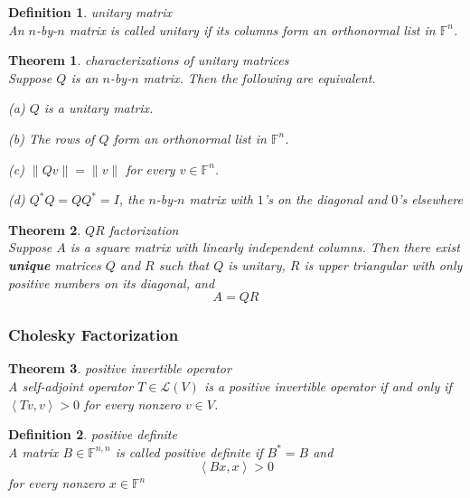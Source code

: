 \documentclass{article}
\newtheorem{theorem}{Theorem}[subsection]
\newtheorem{definition}{Definition}[subsection]
\newcommand{\FF}{\mathbb{F}}
\begin{document}
\begin{CJK}{UTF8}{gkai}
\begin{definition}
    unitary matrix\\

    An $n$-by-$n$ matrix is called unitary if its columns form an orthonormal list in $\FF^n$.
\end{definition}

\begin{theorem}
    characterizations of unitary matrices\\

    Suppose $Q$ is an $n$-by-$n$ matrix. Then the following are equivalent.

    (a) $Q$ is a unitary matrix.

    (b) The rows of $Q$ form an orthonormal list in $\FF^n$.

    (c) $\|Qv\| = \|v\|$ for every $v \in \FF^n$.

    (d) $Q^\ast Q = QQ^\ast  = I$, the $n$-by-$n$ matrix with $1$'s on the diagonal and $0$'s elsewhere
\end{theorem}

\begin{theorem}
    $QR$ factorization\\

    Suppose $A$ is a square matrix with linearly independent columns. Then there exist \textbf{unique} matrices $Q$ and $R$ such that $Q$ is unitary, $R$ is upper triangular with only positive numbers on its diagonal, and
    \[A =QR\]
\end{theorem}

\subsubsection{Cholesky Factorization}

\begin{theorem}
    positive invertible operator\\

    A self-adjoint operator $T \in \mathcal{L}(V)$ is a positive invertible operator if and only if $\left<Tv,v\right> > 0$ for every nonzero $v \in V$.
\end{theorem}

\begin{definition}
    positive definite\\

    A matrix $B \in \FF^{n,n}$ is called positive definite if $B^\ast  = B$ and
    \[\left<Bx,x\right> > 0\]
    for every nonzero $x \in \FF^n$
\end{definition}


\end{CJK}
\end{document}
